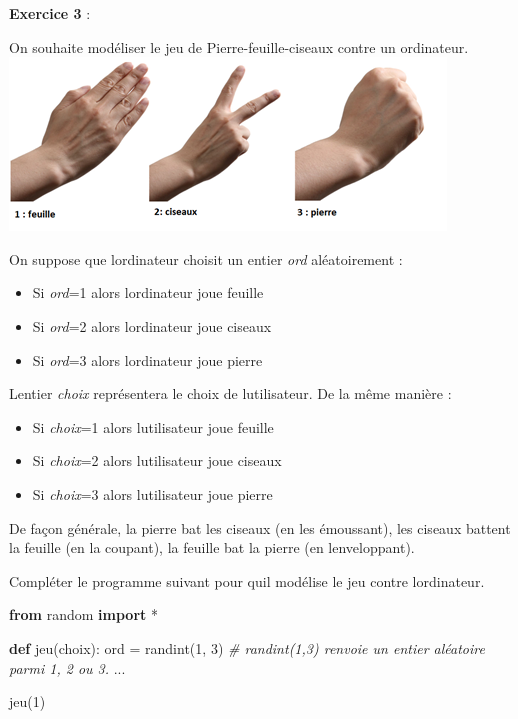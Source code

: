 \documentclass[
  paper=a4,
  ,captions=tableheading
]{scrartcl}
\newenvironment{Shaded}{}{}
\newcommand{\BuiltInTok}[1]{\textcolor[rgb]{0.00,0.50,0.00}{#1}}
\newcommand{\CommentTok}[1]{\textcolor[rgb]{0.38,0.63,0.69}{\textit{#1}}}
\newcommand{\DecValTok}[1]{\textcolor[rgb]{0.25,0.63,0.44}{#1}}
\newcommand{\ImportTok}[1]{\textcolor[rgb]{0.00,0.50,0.00}{\textbf{#1}}}
\newcommand{\KeywordTok}[1]{\textcolor[rgb]{0.00,0.44,0.13}{\textbf{#1}}}
\newcommand{\NormalTok}[1]{#1}
\newcommand{\OperatorTok}[1]{\textcolor[rgb]{0.40,0.40,0.40}{#1}}
\providecommand{\tightlist}{%
  \setlength{\itemsep}{0pt}\setlength{\parskip}{0pt}}
\begin{document}
\textbf{Exercice 3} :

On souhaite modéliser le jeu de Pierre-feuille-ciseaux contre un
ordinateur. \includegraphics{images/1-image1.png}

On suppose que l\textquotesingle ordinateur choisit un entier \emph{ord}
aléatoirement :

\begin{itemize}
\tightlist
\item
  Si \emph{ord}=1 alors l\textquotesingle ordinateur joue feuille
\item
  Si \emph{ord}=2 alors l\textquotesingle ordinateur joue ciseaux
\item
  Si \emph{ord}=3 alors l\textquotesingle ordinateur joue pierre
\end{itemize}

L\textquotesingle entier \emph{choix} représentera le choix de
l\textquotesingle utilisateur. De la même manière :

\begin{itemize}
\tightlist
\item
  Si \emph{choix}=1 alors l\textquotesingle utilisateur joue feuille
\item
  Si \emph{choix}=2 alors l\textquotesingle utilisateur joue ciseaux
\item
  Si \emph{choix}=3 alors l\textquotesingle utilisateur joue pierre
\end{itemize}

De façon générale, la pierre bat les ciseaux (en les émoussant), les
ciseaux battent la feuille (en la coupant), la feuille bat la pierre (en
l\textquotesingle enveloppant).

Compléter le programme suivant pour qu\textquotesingle il modélise le
jeu contre l\textquotesingle ordinateur.

\begin{Shaded}
\begin{Highlighting}[]
\ImportTok{from}\NormalTok{ random }\ImportTok{import} \OperatorTok{*}


\KeywordTok{def}\NormalTok{ jeu(choix):}
    \BuiltInTok{ord} \OperatorTok{=}\NormalTok{ randint(}\DecValTok{1}\NormalTok{, }\DecValTok{3}\NormalTok{)  }\CommentTok{\# randint(1,3) renvoie un entier aléatoire parmi 1, 2 ou 3.}
\NormalTok{    ...}


\NormalTok{jeu(}\DecValTok{1}\NormalTok{)}
\end{Highlighting}
\end{Shaded}
\end{document}
